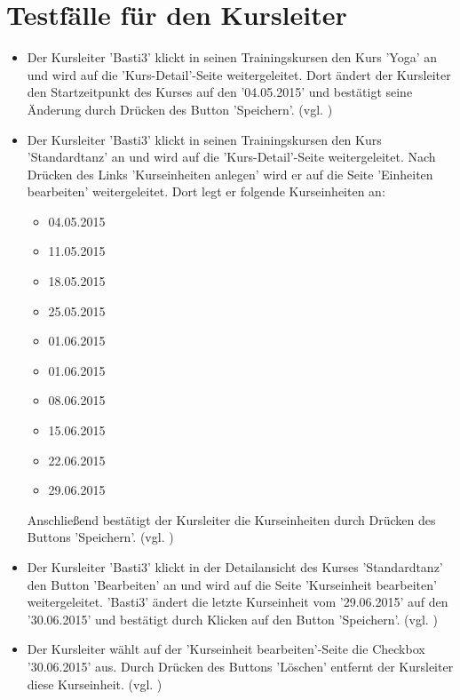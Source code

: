 \documentclass[a4paper]{scrreprt}
\newcounter{Lc}
\newcounter{Hc}
\newcommand{\stepHc}{\stepcounter{Hc}\setcounter{Lc}{0}}
\begin{document}
	\section{Testfälle für den Kursleiter}
		\stepHc
		\begin{itemize}
			\item {} 
			 Der Kursleiter 'Basti3' klickt in seinen Trainingskursen den Kurs 'Yoga' an und wird auf die 'Kurs-Detail'-Seite weitergeleitet. Dort ändert der Kursleiter den Startzeitpunkt des Kurses auf den '04.05.2015' und bestätigt seine Änderung durch Drücken des Button 'Speichern'. (vgl. )
				
			\item {} 
			 Der Kursleiter 'Basti3' klickt in seinen Trainingskursen den Kurs 'Standardtanz' an und wird auf die 'Kurs-Detail'-Seite weitergeleitet. Nach Drücken des Links 'Kurseinheiten anlegen' wird er auf die Seite 'Einheiten bearbeiten' weitergeleitet. Dort legt er folgende Kurseinheiten an:
				\begin{itemize}
					\item 04.05.2015
					\item 11.05.2015
					\item 18.05.2015
					\item 25.05.2015
					\item 01.06.2015
					\item 01.06.2015
					\item 08.06.2015
					\item 15.06.2015
					\item 22.06.2015
					\item 29.06.2015
				\end{itemize}	
			 Anschließend bestätigt der Kursleiter die Kurseinheiten durch Drücken des Buttons 'Speichern'. (vgl. )
			
			\item {}
			 Der Kursleiter 'Basti3' klickt in der Detailansicht des Kurses 'Standardtanz' den Button 'Bearbeiten' an und wird auf die Seite 'Kurseinheit bearbeiten' weitergeleitet. 'Basti3' ändert die letzte Kurseinheit vom '29.06.2015' auf den '30.06.2015' und bestätigt durch Klicken auf den Button 'Speichern'. (vgl. )
			
			\item {}
			 Der Kursleiter wählt auf der 'Kurseinheit bearbeiten'-Seite die Checkbox '30.06.2015' aus. Durch Drücken des Buttons 'Löschen' entfernt der Kursleiter diese Kurseinheit. (vgl. )			
		\end{itemize}
		
\end{document}
